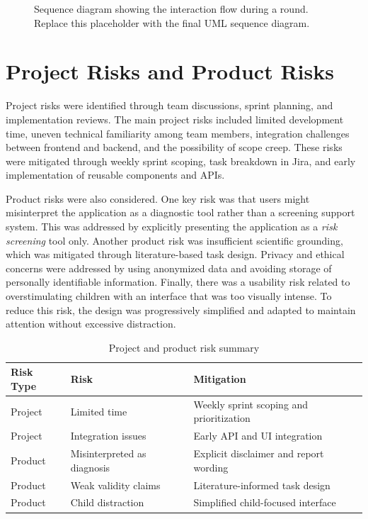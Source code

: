\documentclass[conference]{IEEEtran}
\begin{document}
\begin{figure}[htbp]
\centering
{}
\caption{Sequence diagram showing the interaction flow during a round. Replace this placeholder with the final UML sequence diagram.}
\label{fig:uml_sequence}
\end{figure}

\section{Project Risks and Product Risks}

Project risks were identified through team discussions, sprint planning, and implementation reviews. The main project risks included limited development time, uneven technical familiarity among team members, integration challenges between frontend and backend, and the possibility of scope creep. These risks were mitigated through weekly sprint scoping, task breakdown in Jira, and early implementation of reusable components and APIs.

Product risks were also considered. One key risk was that users might misinterpret the application as a diagnostic tool rather than a screening support system. This was addressed by explicitly presenting the application as a \textit{risk screening} tool only. Another product risk was insufficient scientific grounding, which was mitigated through literature-based task design. Privacy and ethical concerns were addressed by using anonymized data and avoiding storage of personally identifiable information. Finally, there was a usability risk related to overstimulating children with an interface that was too visually intense. To reduce this risk, the design was progressively simplified and adapted to maintain attention without excessive distraction.

\begin{table}[htbp]
\caption{Project and product risk summary}
\label{tab:risk_table}
\centering
\begin{tabular}{|p{2.1cm}|p{2.2cm}|p{2.8cm}|}
\hline
\textbf{Risk Type} & \textbf{Risk} & \textbf{Mitigation} \\
\hline
Project & Limited time & Weekly sprint scoping and prioritization \\
\hline
Project & Integration issues & Early API and UI integration \\
\hline
Product & Misinterpreted as diagnosis & Explicit disclaimer and report wording \\
\hline
Product & Weak validity claims & Literature-informed task design \\
\hline
Product & Child distraction & Simplified child-focused interface \\
\hline
\end{tabular}
\end{table}
\end{document}
